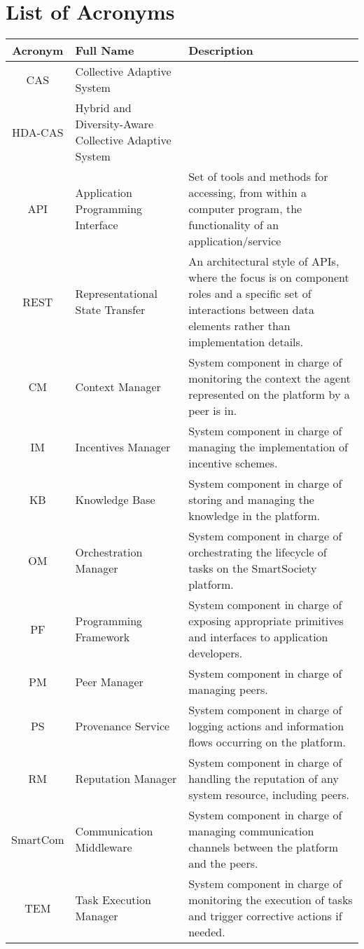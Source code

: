\documentclass{SmartReport}
\begin{document}
\section*{List of Acronyms}
\begin{tabular}{|c|p{3cm}|p{10cm}|}
\hline 
\textbf{Acronym} & \textbf{Full Name} & \textbf{Description} \\
\hline 
\hline 
CAS & Collective Adaptive System & \\ \hline
HDA-CAS & Hybrid and Diversity-Aware Collective Adaptive System & \\ \hline
API & Application Programming Interface & Set of tools and methods for accessing, from within a computer program, the functionality of an application/service \\ \hline
REST & Representational State Transfer & An architectural style of APIs, where the focus is on component roles and a specific set of interactions between data elements rather than implementation details.\\ \hline
CM & Context Manager & System component in charge of monitoring the
context the agent represented on the platform by a peer is in.\\
\hline
IM & Incentives Manager & System component in charge of managing the implementation of incentive schemes.\\  
\hline 
KB & Knowledge Base &  System component in charge of storing and managing the knowledge in the platform.\\
\hline
OM & Orchestration Manager &  System component in charge of
orchestrating the lifecycle of tasks on the SmartSociety platform. \\
\hline 
PF & Programming Framework &  System component in charge of exposing
appropriate primitives and interfaces to application developers.\\
\hline 
PM & Peer Manager &  System component in charge of managing peers.\\
\hline 
PS & Provenance Service & System component in charge of logging actions and information flows occurring on the platform.\\
\hline
RM & Reputation Manager & System component in charge of handling the reputation of any system resource, including peers. \\
\hline
SmartCom & Communication Middleware & System component in charge of managing
communication channels between the platform and the peers. \\
\hline
TEM & Task Execution Manager & System component in charge of
monitoring the execution of tasks and trigger corrective actions if
needed.\\
\hline
\end{tabular}
\end{document}
